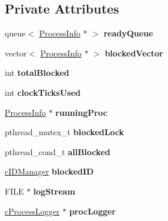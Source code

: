 \subsection*{\-Private \-Attributes}
\begin{DoxyCompactItemize}
\item 
\hypertarget{classcRoundRobin_af8667fa086a7562c2523d5b5cd783d75}{queue$<$ \hyperlink{structProcessInfo}{\-Process\-Info} $\ast$ $>$ {\bfseries ready\-Queue}}\label{dc/dcc/classcRoundRobin_af8667fa086a7562c2523d5b5cd783d75}

\item 
\hypertarget{classcRoundRobin_a2816611cab817668edbeceff1a17ccca}{vector$<$ \hyperlink{structProcessInfo}{\-Process\-Info} $\ast$ $>$ {\bfseries blocked\-Vector}}\label{dc/dcc/classcRoundRobin_a2816611cab817668edbeceff1a17ccca}

\item 
\hypertarget{classcRoundRobin_a2068152f0b3d1592dc031ecf7b0d7d5f}{int {\bfseries total\-Blocked}}\label{dc/dcc/classcRoundRobin_a2068152f0b3d1592dc031ecf7b0d7d5f}

\item 
\hypertarget{classcRoundRobin_a8779f8cb28be168316b485c77d09b210}{int {\bfseries clock\-Ticks\-Used}}\label{dc/dcc/classcRoundRobin_a8779f8cb28be168316b485c77d09b210}

\item 
\hypertarget{classcRoundRobin_a58ea813b29ddc7ca0da1428a1fcb7693}{\hyperlink{structProcessInfo}{\-Process\-Info} $\ast$ {\bfseries running\-Proc}}\label{dc/dcc/classcRoundRobin_a58ea813b29ddc7ca0da1428a1fcb7693}

\item 
\hypertarget{classcRoundRobin_a3b5a8047d5522b85a486f1caeeaca9f6}{pthread\-\_\-mutex\-\_\-t {\bfseries blocked\-Lock}}\label{dc/dcc/classcRoundRobin_a3b5a8047d5522b85a486f1caeeaca9f6}

\item 
\hypertarget{classcRoundRobin_ac9f22c160b4e3cb118723a1e780575ad}{pthread\-\_\-cond\-\_\-t {\bfseries all\-Blocked}}\label{dc/dcc/classcRoundRobin_ac9f22c160b4e3cb118723a1e780575ad}

\item 
\hypertarget{classcRoundRobin_a15ca5ec15a4ae935706b55ac71d6bee2}{\hyperlink{classcIDManager}{c\-I\-D\-Manager} {\bfseries blocked\-I\-D}}\label{dc/dcc/classcRoundRobin_a15ca5ec15a4ae935706b55ac71d6bee2}

\item 
\hypertarget{classcRoundRobin_a2a2f87f637cb0cbfd9d2bfe69bc91de2}{\-F\-I\-L\-E $\ast$ {\bfseries log\-Stream}}\label{dc/dcc/classcRoundRobin_a2a2f87f637cb0cbfd9d2bfe69bc91de2}

\item 
\hypertarget{classcRoundRobin_aa740c249a96cdc04f04a93ae039a6551}{\hyperlink{classcProcessLogger}{c\-Process\-Logger} $\ast$ {\bfseries proc\-Logger}}\label{dc/dcc/classcRoundRobin_aa740c249a96cdc04f04a93ae039a6551}

\end{DoxyCompactItemize}


